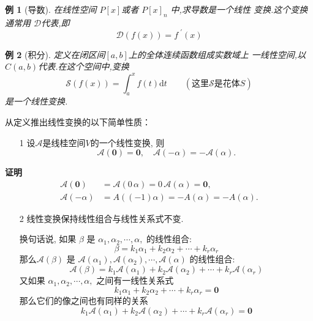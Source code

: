 \documentclass[13pt]{beamer}
\newtheorem{exa}{例}
\def\pf{{\bf 证明~~ }}
\def\A{\mathscr{A}}
\def\0{\mathbf{0}}
\def\a{\alpha}
\begin{document}
\begin{frame}
\begin{exa}[导数]
在线性空间 $P[x]$或者 $P[x]_{n}$ 中,求导数是一个线性
变换.这个变换通常用 $\mathscr{D}$代表,即
\[
\mathscr{D}(f(x))=f^{\, \,\prime}(x)
\]
\end{exa}

\begin{exa}[积分]
	定义在闭区间$[a,b]$上的全体连续函数组成实数域上 一线性空间,以 $C(a,b)$代表.在这个空间中,变换
	\[
	\mathscr{S}(f(x))=\int_{a}^{x} f(t) \mathrm{d} t   \qquad (\mbox{这里}\mathscr{S} \mbox{是花体} S)
	\] 
	是一个线性变换.
\end{exa}

\end{frame}





\begin{frame}


从定义推出线性变换的以下简单性质：

\begin{itemize}
	\item[1] 设$\A$是线桂空间$V$的一个线性变换, 则
	$$\A(\0)=\0, \quad \A(-\alpha)=-\A(\alpha).$$
\end{itemize}

\pf\\[-30pt]
\begin{align*}
\A(\0)& =\A(0\, \a) =0\,  \A(\a) =\0, \\
\A(-\alpha) & =A\left( (-1) \alpha\right)=-A(\alpha)=-A(\alpha).
\end{align*}

\end{frame}


\begin{frame}
\begin{itemize}
	\item[2] 线性变换保持线性组合与线性关系式不变.
	
	换句话说, 如果 ${\beta}$ 是 ${\alpha}_{1}, {\alpha}_{2}, \cdots, {\alpha},$ 的线性组合:
	\[
	{\beta}=k_{1} {\alpha}_{1}+k_{2} {\alpha}_{2}+\cdots+k_{r} {\alpha}_{r}
	\]
	那么$\A(\beta)$ 是 $\A({\alpha}_{1}), \A({\alpha}_{2}), \cdots, \A({\alpha})$ 的线性组合:
	\[
	\mathscr{A}({\beta})=k_{1} \mathscr{A}\left({\alpha}_{1}\right)+k_{2} \mathscr{A}\left({\alpha}_{2}\right)+\cdots+k_{r}  \mathscr{A}\left({\alpha}_{r}\right)
	\]
	又如果 ${\alpha}_{1}, {\alpha}_{2}, \cdots, {\alpha},$ 之间有一线性关系式
\[
k_{1} {\alpha}_{1}+k_{2} {\alpha}_{2}+\cdots+k_{r} {\alpha}_{r}=\0
\]
那么它们的像之间也有同样的关系
\[
k_{1}  \mathscr{A}\left({\alpha}_{1}\right)+k_{2}  \mathscr{A}\left({\alpha}_{2}\right)+\cdots+k_{r}  \mathscr{A}\left({\alpha}_{r}\right)={\0}
\]

	
\end{itemize}
\end{frame}
\end{document}
